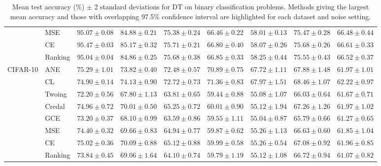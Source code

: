 \documentclass[letterpaper]{article} %
\begin{document}
\begin{table}[t]
\begin{tabular}{clccccccc}
 & MSE    & $95.07 \pm 0.08$ & $84.88 \pm 0.21$ & $75.38 \pm 0.24$ & $66.46 \pm 0.22$ & $58.01 \pm 0.13$ & $75.47 \pm 0.28$ & $66.48 \pm 0.44$ \\ 
 & CE     & $\mathbf{95.47 \pm 0.03}$ & $85.17 \pm 0.32$ & $75.71 \pm 0.21$ & $66.80 \pm 0.40$ & $58.07 \pm 0.26$ & $75.68 \pm 0.26$ & $66.61 \pm 0.33$ \\ 
 & Ranking & $95.04 \pm 0.04$ & $84.86 \pm 0.25$ & $75.68 \pm 0.38$ & $66.85 \pm 0.33$ & $58.25 \pm 0.44$ & $75.55 \pm 0.43$ & $66.52 \pm 0.37$ \\ 
\hline
\multirow{8}{*}{CIFAR-10}
 & ANE    & $\mathbf{75.29 \pm 1.01}$ & $\mathbf{73.82 \pm 0.40}$ & $\mathbf{72.48 \pm 0.57}$ & $\mathbf{70.89 \pm 0.75}$ & $\mathbf{67.72 \pm 1.11}$ & $\mathbf{67.88 \pm 1.48}$ & $\mathbf{61.97 \pm 1.01}$ \\ 
 & CL     & $\mathbf{74.90 \pm 0.14}$ & $\mathbf{74.13 \pm 0.90}$ & $\mathbf{72.72 \pm 0.73}$ & $\mathbf{71.36 \pm 0.83}$ & $\mathbf{67.97 \pm 1.51}$ & $\mathbf{68.46 \pm 1.07}$ & $\mathbf{62.22 \pm 0.97}$ \\ 
 & Twoing & $72.20 \pm 0.56$ & $67.80 \pm 1.13$ & $63.81 \pm 0.65$ & $59.44 \pm 0.88$ & $55.08 \pm 1.07$ & $66.03 \pm 0.64$ & $\mathbf{61.67 \pm 0.71}$ \\ 
 & Credal & $\mathbf{74.96 \pm 0.72}$ & $70.01 \pm 0.50$ & $65.25 \pm 0.72$ & $60.01 \pm 0.90$ & $55.12 \pm 1.94$ & $\mathbf{67.26 \pm 1.26}$ & $\mathbf{61.97 \pm 1.02}$ \\ 
 & GCE    & $73.20 \pm 0.37$ & $68.10 \pm 0.99$ & $63.59 \pm 0.86$ & $59.55 \pm 1.11$ & $55.04 \pm 0.87$ & $65.79 \pm 0.66$ & $\mathbf{61.27 \pm 0.65}$ \\ 
 & MSE    & $\mathbf{74.40 \pm 0.32}$ & $69.66 \pm 0.83$ & $64.94 \pm 0.77$ & $59.87 \pm 0.62$ & $55.26 \pm 1.13$ & $66.63 \pm 0.60$ & $\mathbf{61.85 \pm 1.04}$ \\ 
 & CE     & $\mathbf{75.02 \pm 0.36}$ & $70.09 \pm 0.88$ & $65.12 \pm 0.88$ & $59.99 \pm 0.58$ & $55.26 \pm 0.54$ & $\mathbf{67.08 \pm 0.92}$ & $\mathbf{61.96 \pm 0.85}$ \\ 
 & Ranking & $73.84 \pm 0.45$ & $69.06 \pm 1.64$ & $64.10 \pm 0.74$ & $59.79 \pm 1.19$ & $55.12 \pm 1.08$ & $66.72 \pm 0.94$ & $\mathbf{61.07 \pm 0.82}$ \\ 
\hline
\end{tabular} 
\caption{Mean test accuracy (\%) $\pm$ 2 standard deviations for DT on binary classification problems. Methods giving the largest mean accuracy and those with overlapping 97.5\% confidence interval are highlighted for each dataset and noise setting.}  
\label{tab:dt-bin}
\end{table} 
\end{document}
